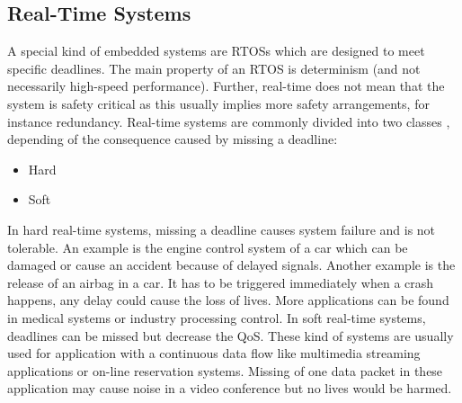 \subsection{Real-Time Systems}
A special kind of embedded systems are \acp{RTOS} which are designed to meet specific deadlines. 
The main property of an \ac{RTOS} is determinism (and not necessarily high-speed performance).  
Further, real-time does not mean that the system is safety critical as this usually implies more safety arrangements, for instance redundancy.
Real-time systems are commonly divided into two classes \cite{stromblad:elfrtoemd}, depending of the consequence caused by missing a deadline:
\begin{itemize}
	\item Hard
	\item Soft
\end{itemize}
In hard real-time systems, missing a deadline causes system failure and is not tolerable.  
An example is the engine control system of a car which can be damaged or cause an accident because of delayed signals.
Another example is the release of an airbag in a car. 
It has to be triggered immediately when a crash happens, any delay could cause the loss of lives. 
More applications can be found in medical systems or industry processing control.  
In soft real-time systems, deadlines can be missed but decrease the \ac{QoS}. 
These kind of systems are usually used for application with a continuous data flow like multimedia streaming applications or on-line reservation systems.
Missing of one data packet in these application may cause noise in a video conference but no lives would be harmed.

